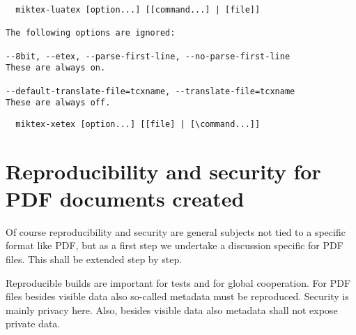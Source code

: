 \documentclass[a4paper, english]{article}%
\newcommand{\lualatex}{\texttt{lualatex}}
\newcommand{\xelatex}{\texttt{xelatex}}
\newcommand{\texlive}{\TeX~Live}
\newcommand{\miktex}{MiKTeX}
\begin{document}
\begin{verbatim}
  miktex-luatex [option...] [[command...] | [file]]

The following options are ignored:

--8bit, --etex, --parse-first-line, --no-parse-first-line
These are always on.

--default-translate-file=tcxname, --translate-file=tcxname
These are always off.
\end{verbatim}



  
  
  

\begin{verbatim}
  miktex-xetex [option...] [[file] | [\command...]]
\end{verbatim}







\section{Reproducibility and security for PDF documents created}\label{sec:PDFreprSec}

Of course reproducibility and security are general subjects not tied to a specific format like PDF, 
but as a first step we undertake a discussion specific for PDF files. 
This shall be extended step by step. 

Reproducible builds are important for tests and for global cooperation. 
For PDF files besides visible data also so-called metadata must be reproduced. 
Security is mainly privacy here. 
Also, besides visible data also metadata shall not expose private data. 
\end{document}
